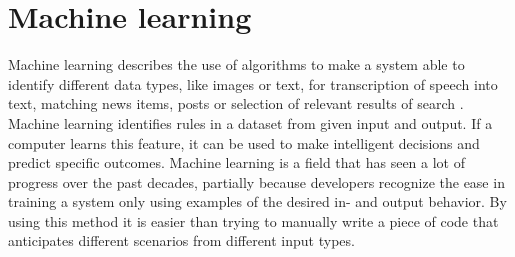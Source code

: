 \section{Machine learning}
Machine learning describes the use of algorithms to make a system able to identify different data types, like images or text, for transcription of speech into text, matching news items, posts or selection of relevant results of search \citep{LeCun2015}.
Machine learning identifies rules in a dataset from given input and output. If a computer learns this feature, it can be used to make intelligent decisions and predict specific outcomes.\citep{Nielsen2010}
Machine learning is a field that has seen a lot of progress over the past decades, partially because developers recognize the ease in training a system only using examples of the desired in- and output behavior. By using this method it is easier than trying to manually write a piece of code that anticipates different scenarios from different input types.\citep{Jordan2015}


